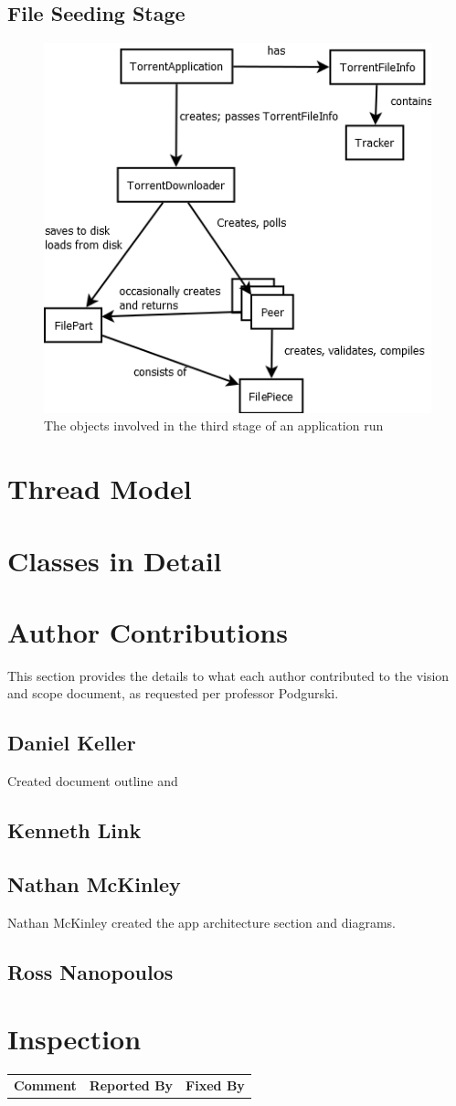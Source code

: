 \documentclass[letter]{scrartcl}
\begin{document}
\subsection{File Seeding Stage}
\begin{figure}[h]
\centering
\includegraphics[scale=.5]{stepTwo.png}
\caption{The objects involved in the third stage of an application run}
\end{figure}


\section{Thread Model}

\section{Classes in Detail}

\pagebreak
\section{Author Contributions}
This section provides the details to what each author contributed to the vision and scope document, as requested per professor Podgurski.
\subsection{Daniel Keller}
Created document outline and 
\subsection{Kenneth Link}

\subsection{Nathan McKinley}
Nathan McKinley created the app architecture section and diagrams.
\subsection{Ross Nanopoulos}


\section{Inspection}
\begin{tabularx}{\textwidth}{X c c}
\textbf{Comment} & \textbf{Reported By} & \textbf{Fixed By} \\
\end{tabularx}
\end{document}
